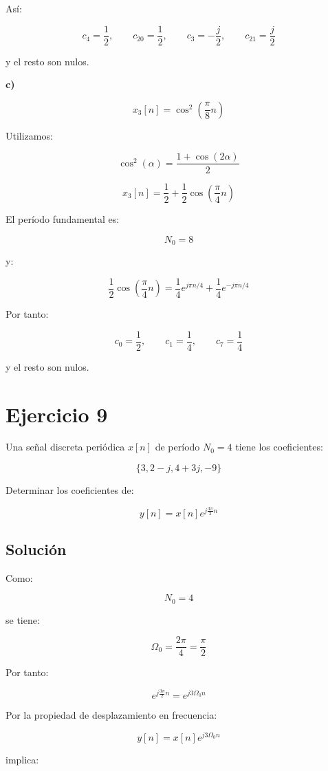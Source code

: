 \documentclass[fleqn]{article}
\begin{document}
	Así:

	\[
	\boxed{
	c_4=\frac{1}{2},
	\qquad
	c_{20}=\frac{1}{2},
	\qquad
	c_3=-\frac{j}{2},
	\qquad
	c_{21}=\frac{j}{2}
	}
	\]

	y el resto son nulos.

	\textbf{c)}

	\[
	x_3[n]
	=
	\cos^2\left(\frac{\pi}{8}n\right)
	\]

	Utilizamos:

	\[
	\cos^2(\alpha)
	=
	\frac{1+\cos(2\alpha)}{2}
	\]

	\[
	x_3[n]
	=
	\frac{1}{2}
	+
	\frac{1}{2}
	\cos\left(\frac{\pi}{4}n\right)
	\]

	El período fundamental es:

	\[
	N_0=8
	\]

	y:

	\[
	\frac{1}{2}
	\cos\left(\frac{\pi}{4}n\right)
	=
	\frac{1}{4}e^{j\pi n/4}
	+
	\frac{1}{4}e^{-j\pi n/4}
	\]

	Por tanto:

	\[
	\boxed{
	c_0=\frac{1}{2},
	\qquad
	c_1=\frac{1}{4},
	\qquad
	c_7=\frac{1}{4}
	}
	\]

	y el resto son nulos.

\section{Ejercicio 9}
	Una señal discreta periódica $x[n]$ de período $N_0=4$ tiene los coeficientes:

	\[
	\{3,2-j,4+3j,-9\}
	\]

	Determinar los coeficientes de:

	\[
	y[n]
	=
	x[n]e^{j\frac{3\pi}{2}n}
	\]

	\subsection{Solución}

	Como:

	\[
	N_0=4
	\]

	se tiene:

	\[
	\Omega_0
	=
	\frac{2\pi}{4}
	=
	\frac{\pi}{2}
	\]

	Por tanto:

	\[
	e^{j\frac{3\pi}{2}n}
	=
	e^{j3\Omega_0n}
	\]

	Por la propiedad de desplazamiento en frecuencia:

	\[
	y[n]
	=
	x[n]e^{j3\Omega_0n}
	\]

	implica:
\end{document}
